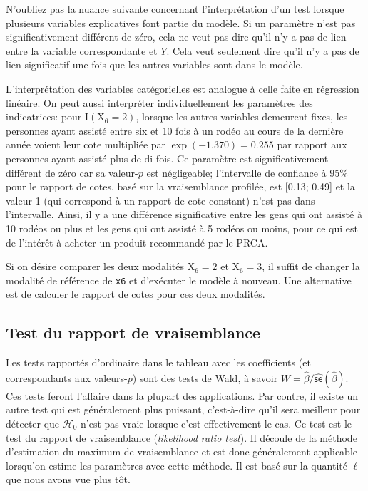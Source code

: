 \documentclass[
  11pt,
  letterpaper,
]{scrbook}
\theoremstyle{definition}
\theoremstyle{remark}
\begin{document}
N'oubliez pas la nuance suivante concernant l'interprétation d'un test
lorsque plusieurs variables explicatives font partie du modèle. Si un
paramètre n'est pas significativement différent de zéro, cela ne veut
pas dire qu'il n'y a pas de lien entre la variable correspondante et
\(Y\). Cela veut seulement dire qu'il n'y a pas de lien significatif une
fois que les autres variables sont dans le modèle.

L'interprétation des variables catégorielles est analogue à celle faite
en régression linéaire. On peut aussi interpréter individuellement les
paramètres des indicatrices: pour \(\mathrm{I}(\mathrm{X}_6=2)\),
lorsque les autres variables demeurent fixes, les personnes ayant
assisté entre six et 10 fois à un rodéo au cours de la dernière année
voient leur cote multipliée par \(\exp(-1.370)=0.255\) par rapport aux
personnes ayant assisté plus de di fois. Ce paramètre est
significativement différent de zéro car sa valeur-\(p\) est négligeable;
l'intervalle de confiance à 95\% pour le rapport de cotes, basé sur la
vraisemblance profilée, est {[}0.13; 0.49{]} et la valeur 1 (qui
correspond à un rapport de cote constant) n'est pas dans l'intervalle.
Ainsi, il y a une différence significative entre les gens qui ont
assisté à 10 rodéos ou plus et les gens qui ont assisté à 5 rodéos ou
moins, pour ce qui est de l'intérêt à acheter un produit recommandé par
le PRCA.

Si on désire comparer les deux modalités \(\mathrm{X}_6=2\) et
\(\mathrm{X}_6=3\), il suffit de changer la modalité de référence de
\texttt{x6} et d'exécuter le modèle à nouveau. Une alternative est de
calculer le rapport de cotes pour ces deux modalités.

\hypertarget{test-du-rapport-de-vraisemblance}{%
\subsection{Test du rapport de
vraisemblance}\label{test-du-rapport-de-vraisemblance}}

Les tests rapportés d'ordinaire dans le tableau avec les coefficients
(et correspondants aux valeurs-\(p\)) sont des tests de Wald, à savoir
\(W = \widehat{\beta}/\widehat{\mathsf{se}}(\widehat{\beta})\). Ces
tests feront l'affaire dans la plupart des applications. Par contre, il
existe un autre test qui est généralement plus puissant, c'est-à-dire
qu'il sera meilleur pour détecter que \(\mathscr{H}_0\) n'est pas vraie
lorsque c'est effectivement le cas. Ce test est le test du rapport de
vraisemblance (\emph{likelihood ratio test}). Il découle de la méthode
d'estimation du maximum de vraisemblance et est donc généralement
applicable lorsqu'on estime les paramètres avec cette méthode. Il est
basé sur la quantité \(\ell\) que nous avons vue plus tôt.
\end{document}
